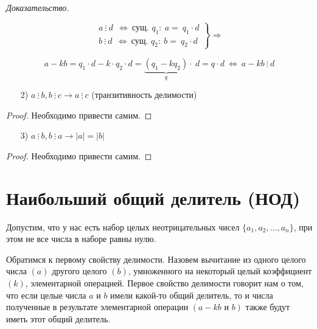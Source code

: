 \documentclass[russian]{lecture-notes}
\begin{document}
\textit{Доказательство.}

\begin{equation*}
\left.\begin{gathered}
a \ \vdots \ d \ \ \Leftrightarrow \  \text{сущ. }  q_1:\ a = \ q_1 \cdot d
    \\
    b \ \vdots \ d \ \ \Leftrightarrow \  \text{сущ. }  q_2:\ b = \ q_2 \cdot d
\end{gathered}\right\}
\Rightarrow
\end{equation*}


\[a - kb = q_1 \cdot d - k \cdot q_2 \cdot d = \underbrace{(q_1 - kq_2)}_q \cdot \ d = q \cdot d \ \Leftrightarrow \ a - kb \ \vdots \ d\]

\begin{itemize}
    \item [2)] $a \ \vdots \ b, b \ \vdots \ c \rightarrow a \ \vdots \ c$ (транзитивность делимости)
\end{itemize}

\begin{proof}
    Необходимо привести самим.
\end{proof}

\begin{itemize}
    \item [3)] $a \ \vdots \ b, b \ \vdots \ a \rightarrow |a| = |b|$
\end{itemize}

\begin{proof}
    Необходимо привести самим.
\end{proof}

\newpage

\section{ Наибольший общий делитель (НОД)}

Допустим, что у нас есть набор целых неотрицательных чисел $\{a_1,a_2,\ldots,a_n\}$, при этом не все числа в наборе равны нулю.

Обратимся к первому свойству делимости. Назовем вычитание из одного целого числа $(a)$ другого целого $(b)$, умноженного на некоторый целый коэффициент $(k)$, элементарной операцией. Первое свойство делимости говорит нам о том, что если целые числа $a$ и $b$ имели какой-то общий делитель, то и числа полученные в результате элементарной операции $(a - kb \text{ и } b)$ также будут иметь этот общий делитель.
\end{document}
